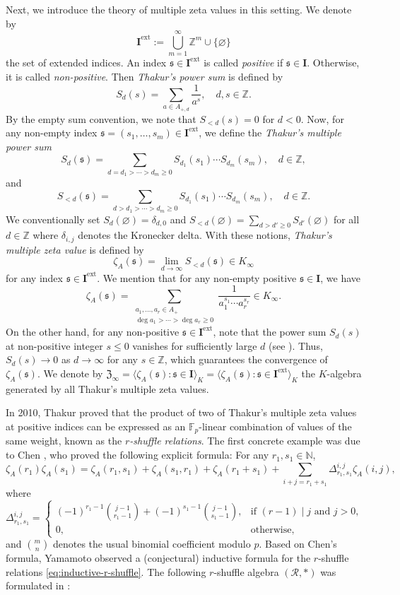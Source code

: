 \documentclass[12pt,reqno]{amsart}
\numberwithin{equation}{section}
\theoremstyle{plain}
\theoremstyle{definition}
\theoremstyle{remark}
\newcommand{\ZZ}{\mathbb{Z}}
\newcommand{\NN}{\mathbb{N}}
\newcommand{\FF}{\mathbb{F}}
\newcommand{\Rcal}{\mathcal{R}}
\newcommand{\ww}[1]{\mathfrak{#1}}
\newcommand{\Ical}{\mathbf{I}}
\newcommand{\Zcal}{\mathfrak{Z}}
\newcommand{\ext}{\mathrm{ext}}
\begin{document}
Next, we introduce the theory of multiple zeta values in this setting. We denote by 
$$\Ical^{\ext}:=\bigcup_{m=1}^\infty \ZZ^m\cup\{\varnothing\}$$
the set of extended indices. An index $\ww{s}\in\Ical^{\ext}$ is called \textit{positive} if $\ww{s}\in\Ical$. Otherwise, it is called \textit{non-positive}. Then \textit{Thakur's power sum} is defined by
$$S_d(s)=\sum_{a\in A_{+,d}}\frac{1}{a^{s}},\quad d,s\in\ZZ.$$
 By the empty sum convention, we note that $S_{<d}(s)=0$ for $d<0$. Now, for any non-empty index $\ww{s}=(s_1,\ldots,s_m)\in\Ical^{\ext}$, we define the \textit{Thakur's multiple power sum}
$$S_d(\ww{s})=\sum_{d=d_1>\cdots>d_m\geq 0}S_{d_1}(s_1)\cdots S_{d_m}(s_m),\quad d\in\ZZ,$$
and
$$S_{<d}(\ww{s})=\sum_{d>d_1>\cdots>d_m\geq 0}S_{d_1}(s_1)\cdots S_{d_m}(s_m),\quad d\in\ZZ.$$
We conventionally set $S_d(\varnothing)=\delta_{d,0}$ and $S_{<d}(\varnothing) = \sum_{d>d'\geq 0}S_{d'}(\varnothing)$ for all $d\in\ZZ$ where $\delta_{i,j}$ denotes the Kronecker delta. 
With these notions, \textit{Thakur's multiple zeta value} is defined by
$$\zeta_A(\ww{s})=\lim_{d\to\infty}S_{<d}(\ww{s})\in K_\infty$$
for any index $\ww{s}\in\Ical^{\ext}$. We mention that for any non-empty positive $\ww{s}\in\Ical$, we have
$$\zeta_A(\ww{s})=\sum_{\substack{a_1,\ldots,a_r\in A_+\\\deg a_1>\cdots>\deg a_r\geq 0}}\frac{1}{a_1^{s_1}\cdots a_r^{s_r}}\in K_\infty.$$
On the other hand, for any non-positive $\ww{s}\in\Ical^{\ext}$, note that the power sum $S_d(s)$ at non-positive integer $s\leq 0$ vanishes for sufficiently large $d$ (see \cite[Theorem 5.1.2]{Thakur2004}). Thus, $S_d(s)\to 0$ as $d\to\infty$ for any $s\in\ZZ$, which guarantees the convergence of $\zeta_A(\ww{s})$. We denote by $\Zcal_\infty=\langle \zeta_A(\ww{s}):\ww{s}\in\Ical\rangle_K=\langle \zeta_A(\ww{s}):\ww{s}\in\Ical^{\ext}\rangle_K$ the $K$-algebra generated by all Thakur's multiple zeta values.

In 2010, Thakur \cite{Thakur2010} proved that the product of two of Thakur's multiple zeta values at positive indices can be expressed as an $\FF_p$-linear combination of values of the same weight, known as the \textit{$r$-shuffle relations}. The first concrete example was due to Chen \cite{Chen2015}, who proved the following explicit formula:
For any $r_1,s_1 \in \NN$,
\[
\zeta_A(r_1)\zeta_A(s_1)=\zeta_A(r_1,s_1)+\zeta_A(s_1,r_1)+\zeta_A(r_1+s_1)+\sum_{i+j=r_1+s_1}\Delta^{i,j}_{r_1,s_1}\zeta_A(i,j),
\]
where 
\begin{equation}\label{eq:df_Delta}
\Delta_{r_1,s_1}^{i,j}=\begin{cases} (-1)^{r_1-1}\binom{j-1}{r_1-1}+(-1)^{s_1-1}\binom{j-1}{s_1-1}, & \text{if } (r-1)\mid j \text{ and }j>0,\\ 0, & \text{otherwise},
    \end{cases}
\end{equation} 
and $\binom{m}{n}$ denotes the usual binomial coefficient modulo $p$. Based on Chen's formula, Yamamoto observed a (conjectural) inductive formula for the $r$-shuffle relations \eqref{eq:inductive-r-shuffle}. The following $r$-shuffle algebra $(\Rcal,\ast)$ was formulated in \cite{Shi2018}:
\end{document}
